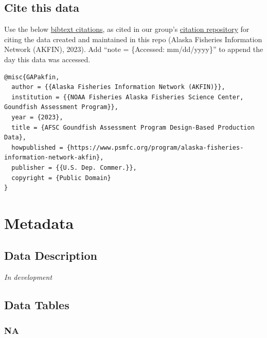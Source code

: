 \documentclass[
  letterpaper,
  oneside,
  open=any]{scrbook}
\begin{document}
\hypertarget{cite-this-data-2}{%
\section*{Cite this data}\label{cite-this-data-2}}


Use the below
\href{https://github.com/afsc-gap-products/gap_products/blob/main/code/CITATION_GAPakfin.bib}{bibtext
citations}, as cited in our group's
\href{https://github.com/afsc-gap-products/citations/blob/main/cite/bibliography.bib}{citation
repository} for citing the data created and maintained in this repo
(Alaska Fisheries Information Network (AKFIN), 2023). Add ``note =
\{Accessed: mm/dd/yyyy\}'' to append the day this data was accessed.

\begin{verbatim}
@misc{GAPakfin,
  author = {{Alaska Fisheries Information Network (AKFIN)}}, 
  institution = {{NOAA Fisheries Alaska Fisheries Science Center, Goundfish Assessment Program}},
  year = {2023}, 
  title = {AFSC Goundfish Assessment Program Design-Based Production Data},
  howpublished = {https://www.psmfc.org/program/alaska-fisheries-information-network-akfin},
  publisher = {{U.S. Dep. Commer.}},
  copyright = {Public Domain} 
}
\end{verbatim}

\hypertarget{metadata}{%
\chapter{Metadata}\label{metadata}}

\hypertarget{data-description-1}{%
\section{Data Description}\label{data-description-1}}

\emph{In development}

\hypertarget{data-tables}{%
\section{Data Tables}\label{data-tables}}

\hypertarget{na}{%
\subsection{NA}\label{na}}
\end{document}
